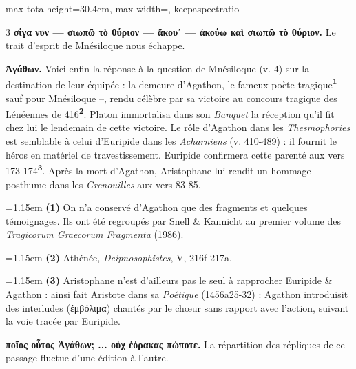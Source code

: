\documentclass[11pt,twoside]{book}
\newcommand{\italique}[1]{\textit{#1}}
\newcommand{\marqueur}[1]{\textsuperscript{\color{rubricRed}\textbf{#1}}}
\begin{document}
\begin{adjustbox}{max totalheight=30.4cm, max width=\textwidth, keepaspectratio}
\begin{minipage}{\textwidth}
{\begin{multicols}{3}
 \textbf{σίγα νυν --- σιωπῶ τὸ θύριον --- ἄκου᾽ --- ἀκούω καὶ σιωπῶ τὸ θύριον.} Le trait d'esprit de Mnésiloque nous échappe.
\par\vspace{1.5pt}
 \textbf{Ἀγάθων.} Voici enfin la réponse à la question de Mnésiloque (v. 4) sur la destination de leur équipée : la demeure d'Agathon, le fameux poète tragique\marqueur{1} – sauf pour Mnésiloque –, rendu célèbre par sa victoire au concours tragique des Lénéennes de 416\marqueur{2}. Platon immortalisa dans son \italique{Banquet} la réception qu'il fit chez lui le lendemain de cette victoire. Le rôle d'Agathon dans les \italique{Thesmophories} est semblable à celui d'Euripide dans les \italique{Acharniens} (v. 410-489) : il fournit le héros en matériel de travestissement. Euripide confirmera cette parenté aux vers 173-174\marqueur{3}. Après la mort d'Agathon, Aristophane lui rendit un hommage posthume dans les \italique{Grenouilles} aux vers 83-85.
\par\vspace{1.5pt}
\par\vspace{1.2pt}\par\nopagebreak\vspace{1pt}\noindent\hangindent=1.15em {\color{sepiaNote}\textbf{(1)}} On n'a conservé d'Agathon que des fragments et quelques témoignages. Ils ont été regroupés par Snell \& Kannicht au premier volume des \italique{Tragicorum Graecorum Fragmenta} (1986).
\par\vspace{1.5pt}
\noindent\hangindent=1.15em {\color{sepiaNote}\textbf{(2)}} Athénée, \italique{Deipnosophistes}, V, 216f-217a.
\par\vspace{1.5pt}
\noindent\hangindent=1.15em {\color{sepiaNote}\textbf{(3)}} Aristophane n'est d'ailleurs pas le seul à rapprocher Euripide \& Agathon : ainsi fait Aristote dans sa \italique{Poétique} (1456a25-32) : Agathon introduisit des interludes (ἐμβόλιμα) chantés par le chœur sans rapport avec l'action, suivant la voie tracée par Euripide.
\par\vspace{1.5pt}
 \textbf{ποῖος οὗτος Ἁγάθων; ... οὐχ ἑόρακας πώποτε.} La répartition des répliques de ce passage fluctue d'une édition à l'autre.

\end{multicols}}
\end{minipage}
\end{adjustbox}
\end{document}
